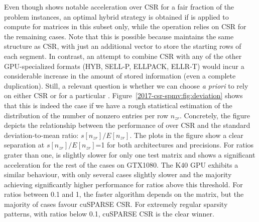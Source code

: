 Even though \bcsr shows notable acceleration over CSR
for a fair fraction of the problem instances,
an optimal hybrid strategy is obtained if \bcsr is applied to compute \spmv
for matrices in this subset only,
while the operation relies on CSR for the remaining cases.
Note that this is possible because \bcsr maintains the same structure as CSR,
with just an additional vector to store the starting rows of each segment.
In contrast, an attempt to combine CSR with any
of the other GPU-specialized formats (HYB, SELL-P, ELLPACK, ELLR-T)
would incur a considerable increase in the amount
of stored information (even a complete duplication).
Still, a relevant question is whether we can choose {\em a priori}
to rely on either CSR or \bcsr for a particular \spmv.
Figure~\ref{2017-csr-spmv:fig:deviation} shows that this is indeed the case
if we have a rough statistical estimation
of the distribution of the number of nonzero entries per row $n_{zr}$.
Concretely, the figure depicts the relationship
between the performance of \bcsr over CSR
and the standard deviation-to-mean ratio:
$s[n_{zr}]/E[n_{zr}]$.
The plots in the figure show a clear separation at
$s[n_{zr}]/E[n_{zr}]$=1 for both architectures and precisions.
For ratios grater than one, \bcsr is slightly slower for only one test matrix
and shows a significant acceleration for the rest of the cases on GTX1080.
The K40 GPU exhibits a similar behaviour,
with only several cases slightly slower and the majority
achieving significantly higher performance for ratios above this threshold.
For ratios between 0.1 and 1, the faster algorithm
depends on the matrix, but the majority of cases favour cuSPARSE CSR.
For extremely regular sparsity patterns, with ratios below 0.1,
cuSPARSE CSR is the clear winner.

